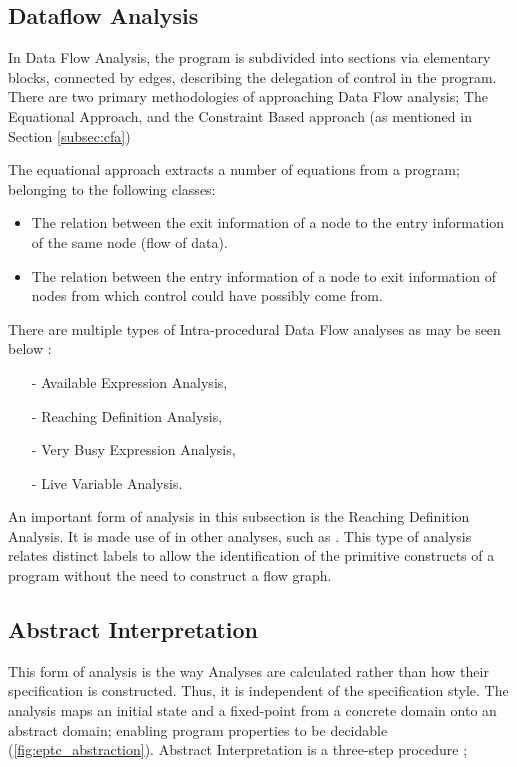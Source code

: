 {		\subsection{Dataflow Analysis}
		\label{subsec:dfa}
		\par In Data Flow Analysis, the program is subdivided into sections via elementary blocks, connected by edges, describing the delegation of control in the program.
		There are two primary methodologies of approaching Data Flow analysis; The Equational Approach, and the Constraint Based approach (as mentioned in Section \ref{subsec:cfa})
		\par The equational approach extracts a number of equations from a program; belonging to the following classes:
				
		\par {}
		\begin{itemize}
			\item The relation between the exit information of a node to the entry information of the same node (flow of data).
			\item The relation between the entry information of a node to exit information of nodes from which control could have possibly come from. 
		\end{itemize}
	
		\par There are multiple types of Intra-procedural Data Flow analyses as may be seen below \cite[pp.33--51]{nielson2004principlesofPA}:
		\begin{itemize}
			\item[-] Available Expression Analysis,
			\item[-] Reaching Definition Analysis,
			\item[-] Very Busy Expression Analysis,
			\item[-] Live Variable Analysis.
		\end{itemize}
	
		\par An important form of analysis in this subsection is the Reaching Definition Analysis. It is made use of in other analyses, such as .
		This type of analysis relates distinct labels to allow the identification of the primitive constructs of a program without the need to construct a flow graph.
	
		\subsection{Abstract Interpretation}
		\label{subsec:abstractinterp}
		\par This form of analysis is the way Analyses are calculated rather than how their specification is constructed. Thus, it is independent of the specification style.
		The analysis maps an initial state and a fixed-point from a concrete domain onto an abstract domain; enabling program properties to be decidable (\ref{fig:eptc_abstraction}). Abstract Interpretation is a three-step procedure \cite[pp.13--17]{nielson2004principlesofPA};
	
}
